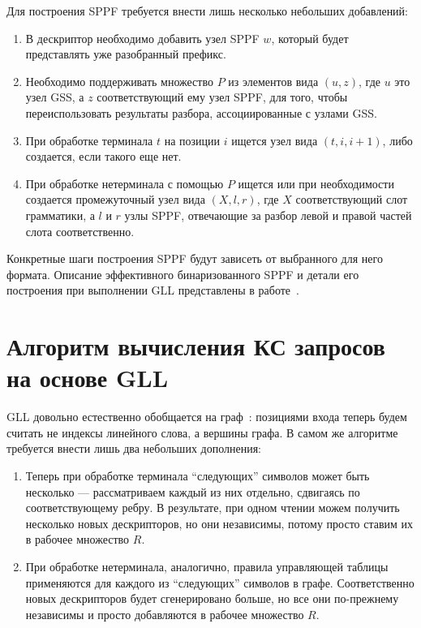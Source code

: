 Для построения SPPF требуется внести лишь несколько небольших добавлений:

\begin{enumerate}
  \item В дескриптор необходимо добавить узел SPPF $ w $, который будет представлять уже разобранный префикс. 
  \item Необходимо поддерживать множество $ P $ из элементов вида $ (u, z) $, где $ u $ это узел GSS, а $ z $ соответствующий ему узел SPPF, для того, чтобы переиспользовать результаты разбора, ассоциированные с узлами GSS. 
  \item При обработке терминала $ t $ на позиции $ i $ ищется узел вида $ (t, i, i + 1) $, либо создается, если такого еще нет.
  \item При обработке нетерминала с помощью $ P $ ищется или при необходимости создается промежуточный узел вида $ (X, l, r) $, где $ X $ соответствующий слот грамматики, а $ l $ и $ r $ узлы SPPF, отвечающие за разбор левой и правой частей слота соответственно.
\end{enumerate}

Конкретные шаги построения SPPF будут зависеть от выбранного для него формата. Описание эффективного бинаризованного SPPF и детали его построения при выполнении GLL представлены в работе~\cite{10.1007/978-3-662-46663-6_5}.

 \section{Алгоритм вычисления КС запросов на основе GLL}

GLL довольно естественно обобщается на граф~\cite{Grigorev:2017:CPQ:3166094.3166104}: позициями входа теперь будем считать не индексы линейного слова, а вершины графа. В самом же алгоритме требуется внести лишь два небольших дополнения:

\begin{enumerate}
  \item Теперь при обработке терминала ``следующих'' символов может быть несколько --- рассматриваем каждый из них отдельно, сдвигаясь по соответствующему ребру. В результате, при одном чтении можем получить несколько новых дескрипторов, но они независимы, потому просто ставим их в рабочее множество $ R $.
  \item При обработке нетерминала, аналогично, правила управляющей таблицы применяются для каждого из ``следующих'' символов в графе. Соответственно новых дескрипторов будет сгенерировано больше, но все они по-прежнему независимы и просто добавляются в рабочее множество $ R $.  
\end{enumerate}

